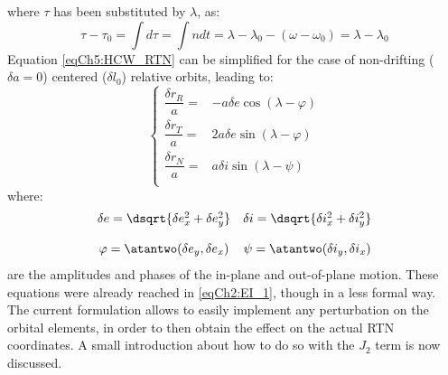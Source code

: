 		\noindent where $\tau$ has been substituted by $\lambda$, as: 
		\[
		\tau - \tau_0 = \int d\tau = \int n dt = \lambda - \lambda_0 - (\omega -  \omega_0) = \lambda - \lambda_0
		\]
		\indent Equation \eqref{eqCh5:HCW_RTN} can be simplified for the case of non-drifting ($\delta a = 0$) centered ($\delta l_0$) relative orbits, leading to:
		\begin{equation}
		\left\{ \begin{array}{ll}
		\dfrac{\delta r_R}{a} = &  - a \delta e \cos(\lambda - \varphi) \\[1.2 em]
		\dfrac{\delta r_T}{a} = & 2a\delta e \sin(\lambda - \varphi)\\[1.2 em]
		\dfrac{\delta r_N}{a} = & a\delta i \sin(\lambda - \psi) \\
		\end{array}\right.
		\label{eqCh5:HCW_RTN_simp}
		\end{equation}
		\noindent where:
		\[
		\begin{array}{cc}
		\delta e = \dsqrt{\delta e_x^2 + \delta e_y^2} & \delta i =  \dsqrt{\delta i_x^2 + \delta i_y^2} \\[1.2 em]
		\varphi = \atantwo (\delta e_y, \delta e_x) &		\psi = \atantwo (\delta i_y, \delta i_x)  
		\end{array}
		\]
		\noindent are the amplitudes and phases of the in-plane and out-of-plane motion. These equations were already reached in \eqref{eqCh2:EI_1}, though in a less formal way. \\
		\indent The current formulation allows to easily implement any perturbation on the orbital elements, in order to then obtain the effect on the actual RTN coordinates. A small introduction about how to do so with the $J_2$ term is now discussed.
